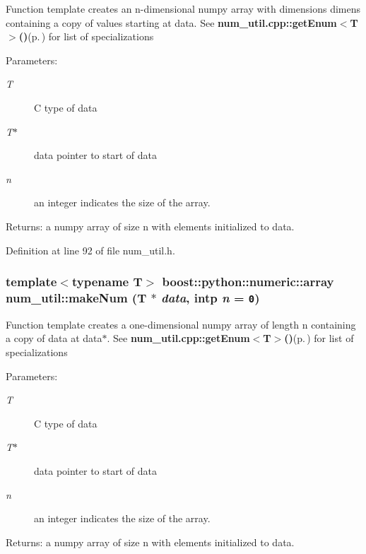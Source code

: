 Function template creates an n-dimensional numpy array with dimensions dimens containing a copy of values starting at data. See {\bf num\_\-util.cpp::get\-Enum$<$T$>$()}{\rm (p.\,\pageref{namespacenum__util_a61})} for list of specializations \begin{Desc}
\item[Parameters:]
\begin{description}
\item[{\em T}]C type of data \item[{\em T$\ast$}]data pointer to start of data \item[{\em n}]an integer indicates the size of the array. \end{description}
\end{Desc}
\begin{Desc}
\item[Returns:]a numpy array of size n with elements initialized to data.\end{Desc}


Definition at line 92 of file num\_\-util.h.
\subsubsection{\setlength{\rightskip}{0pt plus 5cm}template$<$typename T$>$ boost::python::numeric::array num\_\-util::make\-Num (T $\ast$ {\em data}, intp {\em n} = {\tt 0})}\label{namespacenum__util_a62}


Function template creates a one-dimensional numpy array of length n containing a copy of data at data$\ast$. See {\bf num\_\-util.cpp::get\-Enum$<$T$>$()}{\rm (p.\,\pageref{namespacenum__util_a61})} for list of specializations \begin{Desc}
\item[Parameters:]
\begin{description}
\item[{\em T}]C type of data \item[{\em T$\ast$}]data pointer to start of data \item[{\em n}]an integer indicates the size of the array. \end{description}
\end{Desc}
\begin{Desc}
\item[Returns:]a numpy array of size n with elements initialized to data.\end{Desc}


